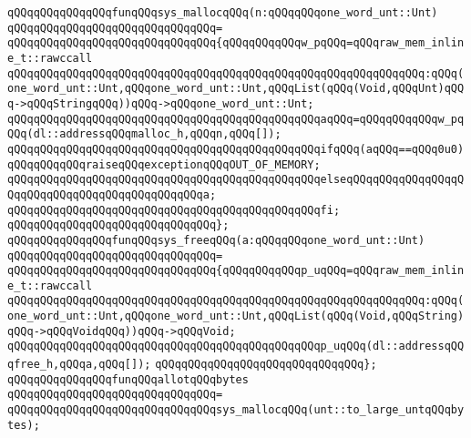 \newline
\verb|qQQqqQQqqQQqqQQqfunqQQqsys_mallocqQQq(n:qQQqqQQqone_word_unt::Unt)|\newline
\verb|qQQqqQQqqQQqqQQqqQQqqQQqqQQqqQQq=|\newline
\verb|qQQqqQQqqQQqqQQqqQQqqQQqqQQqqQQq{qQQqqQQqqQQqw_pqQQq=qQQqraw_mem_inline_t::rawccall|\newline
\verb|qQQqqQQqqQQqqQQqqQQqqQQqqQQqqQQqqQQqqQQqqQQqqQQqqQQqqQQqqQQqqQQq:qQQq(one_word_unt::Unt,qQQqone_word_unt::Unt,qQQqList(qQQq(Void,qQQqUnt)qQQq->qQQqStringqQQq))qQQq->qQQqone_word_unt::Unt;|\newline
\newline
\verb|qQQqqQQqqQQqqQQqqQQqqQQqqQQqqQQqqQQqqQQqqQQqqQQqaqQQq=qQQqqQQqqQQqw_pqQQq(dl::addressqQQqmalloc_h,qQQqn,qQQq[]);|\newline
\newline
\verb|qQQqqQQqqQQqqQQqqQQqqQQqqQQqqQQqqQQqqQQqqQQqqQQqifqQQq(aqQQq==qQQq0u0)qQQqqQQqqQQqraiseqQQqexceptionqQQqOUT_OF_MEMORY;|\newline
\verb|qQQqqQQqqQQqqQQqqQQqqQQqqQQqqQQqqQQqqQQqqQQqqQQqelseqQQqqQQqqQQqqQQqqQQqqQQqqQQqqQQqqQQqqQQqqQQqqQQqa;|\newline
\verb|qQQqqQQqqQQqqQQqqQQqqQQqqQQqqQQqqQQqqQQqqQQqqQQqfi;|\newline
\verb|qQQqqQQqqQQqqQQqqQQqqQQqqQQqqQQq};|\newline
\newline
\verb|qQQqqQQqqQQqqQQqfunqQQqsys_freeqQQq(a:qQQqqQQqone_word_unt::Unt)|\newline
\verb|qQQqqQQqqQQqqQQqqQQqqQQqqQQqqQQq=|\newline
\verb|qQQqqQQqqQQqqQQqqQQqqQQqqQQqqQQq{qQQqqQQqqQQqp_uqQQq=qQQqraw_mem_inline_t::rawccall|\newline
\verb|qQQqqQQqqQQqqQQqqQQqqQQqqQQqqQQqqQQqqQQqqQQqqQQqqQQqqQQqqQQqqQQq:qQQq(one_word_unt::Unt,qQQqone_word_unt::Unt,qQQqList(qQQq(Void,qQQqString)qQQq->qQQqVoidqQQq))qQQq->qQQqVoid;|\newline
\newline
\verb|qQQqqQQqqQQqqQQqqQQqqQQqqQQqqQQqqQQqqQQqqQQqqQQqp_uqQQq(dl::addressqQQqfree_h,qQQqa,qQQq[]);|\newline
\verb|qQQqqQQqqQQqqQQqqQQqqQQqqQQqqQQq};|\newline
\newline
\verb|qQQqqQQqqQQqqQQqfunqQQqallotqQQqbytes|\newline
\verb|qQQqqQQqqQQqqQQqqQQqqQQqqQQqqQQq=|\newline
\verb|qQQqqQQqqQQqqQQqqQQqqQQqqQQqqQQqsys_mallocqQQq(unt::to_large_untqQQqbytes);|\newline
